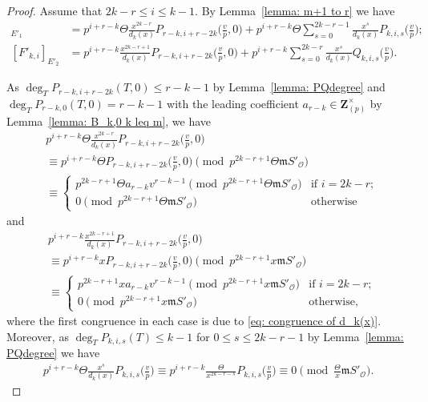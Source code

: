 \documentclass[11pt]{amsart}
\theoremstyle{definition}
\numberwithin{equation}{subsection}
\theoremstyle{plain}
\theoremstyle{plain}
\theoremstyle{plain}
\theoremstyle{plain}
\theoremstyle{plain}
\theoremstyle{plain}
\theoremstyle{plain}
\theoremstyle{plain}
\theoremstyle{plain}
\theoremstyle{plain}
\theoremstyle{plain}
\theoremstyle{plain}
\theoremstyle{definition}
\theoremstyle{definition}
\theoremstyle{definition}
\theoremstyle{remark}
\renewcommand{\(}{\textup{(}}
\renewcommand{\)}{\textup{)}}
\newcommand{\Z}{\mathbf{Z}}
\newcommand{\fm}{\mathfrak{m}}
\newcommand{\cO}{\mathcal{O}}
\begin{document}
\begin{proof}
Assume that $2k-r\leq i\leq k-1$. By Lemma~\ref{lemma: m+1 to r} we have
\begin{align*}
[F'_{k,i}]_{E'_1} &=
    p^{i+r-k}\Theta\frac{x^{2k-r}}{d_k(x)}P_{r-k,i+r-2k}\Big(\frac{v}{p},0\Big)
    +p^{i+r-k}\Theta\sum_{s=0}^{2k-r-1}\frac{x^s}{d_k(x)}P_{k,i,s}\Big(\frac{v}{p}\Big);\\
[F'_{k,i}]_{E'_2} &=p^{i+r-k}
    \frac{x^{2k-r+1}}{d_k(x)}P_{r-k,i+r-2k}\Big(\frac{v}{p},0\Big)
    +p^{i+r-k}\sum_{s=0}^{2k-r}\frac{x^s}{d_k(x)}Q_{k,i,s}\Big(\frac{v}{p}\Big).
\end{align*}


As $\deg_T P_{r-k,i+r-2k}(T,0)\leq r-k-1$ by Lemma~\ref{lemma: PQdegree} and $\deg_TP_{r-k,0}(T,0)=r-k-1$ with the leading coefficient $a_{r-k}\in\Z_{(p)}^\times$ by Lemma~\ref{lemma: B_k,0 k leq m}, we have
\begin{align*}
    &p^{i+r-k}\Theta\frac{x^{2k-r}}{d_k(x)} P_{r-k,i+r-2k}\Big(\frac{v}{p},0\Big)\\
    &\equiv
    p^{i+r-k}\Theta P_{r-k,i+r-2k}\Big(\frac{v}{p},0\Big)\pmod{p^{2k-r+1}\Theta\fm S'_\cO}\\
    &\equiv
    \begin{cases}
        p^{2k-r+1}\Theta a_{r-k}v^{r-k-1} \pmod{p^{2k-r+1}\Theta\fm S'_\cO}& \mbox{if } i=2k-r; \\
        0 \pmod{p^{2k-r+1}\Theta\fm S'_\cO}& \mbox{otherwise}
    \end{cases}
\end{align*}
and
\begin{align*}
    &p^{i+r-k}\frac{x^{2k-r+1}}{d_k(x)} P_{r-k,i+r-2k}\Big(\frac{v}{p},0\Big)\\
    &\equiv
    p^{i+r-k}xP_{r-k,i+r-2k}\Big(\frac{v}{p},0\Big)\pmod{p^{2k-r+1}x\fm S'_\cO}\\
    &\equiv
    \begin{cases}
        p^{2k-r+1}xa_{r-k}v^{r-k-1}\pmod{p^{2k-r+1}x\fm S'_\cO} & \mbox{if } i=2k-r; \\
        0\pmod{p^{2k-r+1}x\fm S'_\cO} & \mbox{otherwise,}
    \end{cases}
\end{align*}
where the first congruence in each case is due to \eqref{eq: congruence of d_k(x)}. Moreover, as $\deg_T P_{k,i,s}(T)\leq k-1$ for $0\leq s\leq 2k-r-1$ by Lemma~\ref{lemma: PQdegree} we have
\begin{align*}
    p^{i+r-k}\Theta\frac{x^s}{d_k(x)}P_{k,i,s}\Big(\frac{v}{p}\Big)
    \equiv p^{i+r-k}\frac{\Theta}{x^{2k-r-s}}P_{k,i,s}\Big(\frac{v}{p}\Big)\equiv 0 \pmod{\frac{\Theta}{x}\fm S'_\cO}.
\end{align*}



\end{proof}
\end{document}
